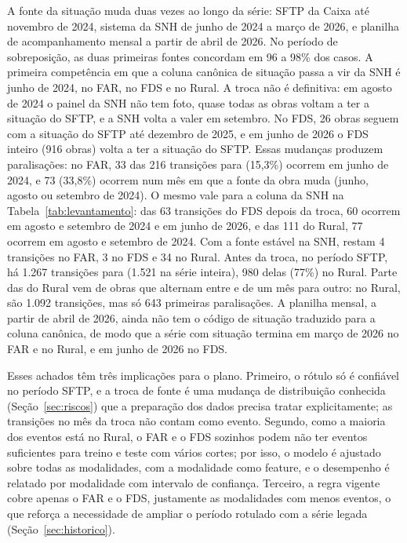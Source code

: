 A fonte da situação muda duas vezes ao longo da série: SFTP da Caixa até novembro de 2024, sistema da SNH de junho de 2024 a março de 2026, e planilha de acompanhamento mensal a partir de abril de 2026. No período de sobreposição, as duas primeiras fontes concordam em 96 a 98\% dos casos. A primeira competência em que a coluna canônica de situação passa a vir da SNH é junho de 2024, no FAR, no FDS e no Rural. A troca não é definitiva: em agosto de 2024 o painel da SNH não tem foto, quase todas as obras voltam a ter a situação do SFTP, e a SNH volta a valer em setembro. No FDS, 26 obras seguem com a situação do SFTP até dezembro de 2025, e em junho de 2026 o FDS inteiro (916 obras) volta a ter a situação do SFTP. Essas mudanças produzem paralisações: no FAR, 33 das 216 transições para  (15,3\%) ocorrem em junho de 2024, e 73 (33,8\%) ocorrem num mês em que a fonte da obra muda (junho, agosto ou setembro de 2024). O mesmo vale para a coluna da SNH na Tabela~\ref{tab:levantamento}: das 63 transições do FDS depois da troca, 60 ocorrem em agosto e setembro de 2024 e em junho de 2026, e das 111 do Rural, 77 ocorrem em agosto e setembro de 2024. Com a fonte estável na SNH, restam 4 transições no FAR, 3 no FDS e 34 no Rural. Antes da troca, no período SFTP, há 1.267 transições para  (1.521 na série inteira), 980 delas (77\%) no Rural. Parte das do Rural vem de obras que alternam entre  e  de um mês para outro: no Rural, são 1.092 transições, mas só 643 primeiras paralisações. A planilha mensal, a partir de abril de 2026, ainda não tem o código de situação traduzido para a coluna canônica, de modo que a série com situação termina em março de 2026 no FAR e no Rural, e em junho de 2026 no FDS.

Esses achados têm três implicações para o plano. Primeiro, o rótulo só é confiável no período SFTP, e a troca de fonte é uma mudança de distribuição conhecida (Seção~\ref{sec:riscos}) que a preparação dos dados precisa tratar explicitamente; as transições no mês da troca não contam como evento. Segundo, como a maioria dos eventos está no Rural, o FAR e o FDS sozinhos podem não ter eventos suficientes para treino e teste com vários cortes; por isso, o modelo é ajustado sobre todas as modalidades, com a modalidade como feature, e o desempenho é relatado por modalidade com intervalo de confiança. Terceiro, a regra vigente cobre apenas o FAR e o FDS, justamente as modalidades com menos eventos, o que reforça a necessidade de ampliar o período rotulado com a série legada (Seção~\ref{sec:historico}).

